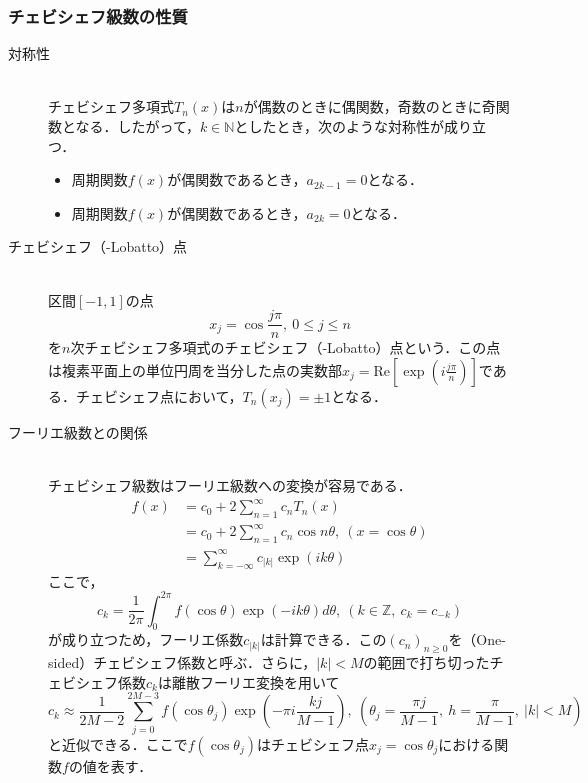 \documentclass[11pt,a4paper]{jsarticle}
\theoremstyle{definition}
\begin{document}
\subsubsection{チェビシェフ級数の性質}
\begin{description}
  \item [対称性]
        \quad \\
        チェビシェフ多項式$T_n(x)$は$n$が偶数のときに偶関数，奇数のときに奇関数となる．したがって，$k\in \mathbb{N}$としたとき，次のような対称性が成り立つ．
        \begin{itemize}
          \item 周期関数$f(x)$が偶関数であるとき，$a_{2k-1}=0$となる．
          \item 周期関数$f(x)$が偶関数であるとき，$a_{2k}=0$となる．
        \end{itemize}
  \item [チェビシェフ（-Lobatto）点]
        \quad \\
        区間$[-1,1]$の点
        \begin{equation*}
          x_j = \cos                 \frac{j\pi}{n},\ 0\leq j \leq n
        \end{equation*}
        を$n$次チェビシェフ多項式のチェビシェフ（-Lobatto）点という．この点は複素平面上の単位円周を当分した点の実数部$x_j = \mathrm{Re} \left[\exp (i \frac{j\pi}{n}) \right]$である．チェビシェフ点において，$T_n(x_j)=\pm1$となる．
  \item[フーリエ級数との関係]
    \quad \\
    チェビシェフ級数はフーリエ級数への変換が容易である．
    \begin{align*}
      f(x) & = c_0 + 2\sum_{n=1}^{\infty} c_n T_n(x)                          \\
           & = c_0 + 2 \sum_{n=1}^{\infty} c_n \cos n\theta,\ (x=\cos \theta) \\
           & = \sum_{k=-\infty}^{\infty} c_{|k|} \exp(ik\theta)
    \end{align*}
    ここで，
    \begin{equation*}
      c_k = \frac{1}{2 \pi} \int_{0}^{2\pi} f(\cos \theta) \exp(-ik\theta) d\theta,\ (k\in \mathbb{Z},\ c_k=c_{-k})
    \end{equation*}
    が成り立つため，フーリエ係数$c_{|k|}$は計算できる．この$(c_n)_{n\geq 0}$を（One-sided）チェビシェフ係数と呼ぶ．さらに，$|k|<M$の範囲で打ち切ったチェビシェフ係数$c_k$は離散フーリエ変換を用いて
    \begin{equation*}
      c_k \approx \frac{1}{2M-2} \sum_{j=0}^{2M-3} f\left(\cos \theta_j\right) \exp\left(-\pi i \frac{kj}{M-1}\right),\ \left(\theta_j = \frac{\pi j}{M-1},\ h = \frac{\pi}{M-1} ,\ |k|<M\right)
    \end{equation*}
    と近似できる．ここで$f(\cos \theta_j)$はチェビシェフ点$x_j=\cos \theta_j$における関数$f$の値を表す．
\end{description}
\end{document}
